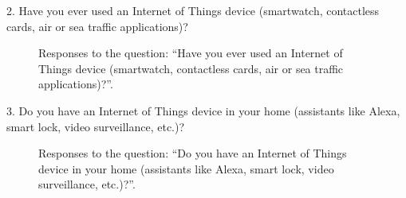 2. Have you ever used an Internet of Things device (smartwatch, contactless cards, air or sea traffic applications)?

\begin{figure}[H]
    \begin{center}
        \caption*{Responses to the question: ``Have you ever used an Internet of Things device (smartwatch, contactless cards, air or sea traffic applications)?''.}
        \label{fig:survey_s6_q2}
    \end{center}
\end{figure}

3. Do you have an Internet of Things device in your home (assistants like Alexa, smart lock, video surveillance, etc.)?

\begin{figure}[H]
    \begin{center}
        \caption*{Responses to the question: ``Do you have an Internet of Things device in your home (assistants like Alexa, smart lock, video surveillance, etc.)?''.}
        \label{fig:survey_s6_q3}
    \end{center}
\end{figure}

